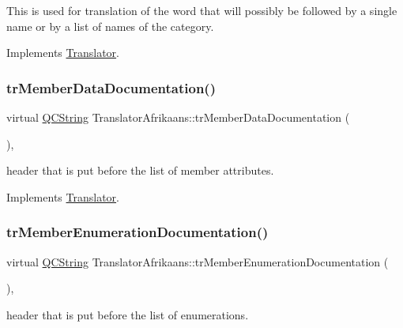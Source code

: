 This is used for translation of the word that will possibly be followed by a single name or by a list of names of the category. 

Implements \mbox{\hyperlink{class_translator}{Translator}}.

\mbox{\label{class_translator_afrikaans_acb6541b5eb5405a6a156ae4d2f299d48}} 
\subsubsection{\texorpdfstring{trMemberDataDocumentation()}{trMemberDataDocumentation()}}
{\footnotesize\ttfamily virtual \mbox{\hyperlink{class_q_c_string}{Q\+C\+String}} Translator\+Afrikaans\+::tr\+Member\+Data\+Documentation (\begin{DoxyParamCaption}{ }\end{DoxyParamCaption})\hspace{0.3cm}{\ttfamily [inline]}, {\ttfamily [virtual]}}

header that is put before the list of member attributes. 

Implements \mbox{\hyperlink{class_translator}{Translator}}.

\mbox{\label{class_translator_afrikaans_a12716d943f043a9869b84355eb878224}} 
\subsubsection{\texorpdfstring{trMemberEnumerationDocumentation()}{trMemberEnumerationDocumentation()}}
{\footnotesize\ttfamily virtual \mbox{\hyperlink{class_q_c_string}{Q\+C\+String}} Translator\+Afrikaans\+::tr\+Member\+Enumeration\+Documentation (\begin{DoxyParamCaption}{ }\end{DoxyParamCaption})\hspace{0.3cm}{\ttfamily [inline]}, {\ttfamily [virtual]}}

header that is put before the list of enumerations. 

